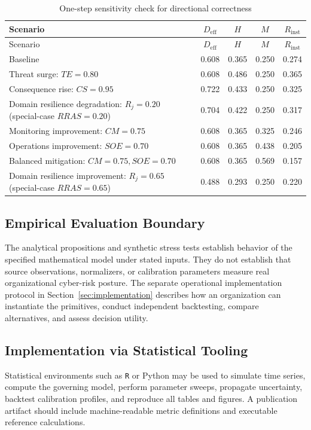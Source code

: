 \documentclass[11pt]{article}
\begin{document}
\begingroup
\small
\setlength{\tabcolsep}{5pt}
\renewcommand{\arraystretch}{1.15}
\begin{longtable}{P{0.47\textwidth} c c c c}
  \caption{One-step sensitivity check for directional correctness}
  \label{tab:sensitivity-check}\\
  \toprule
  Scenario & $D_{\mathrm{eff}}$ & $H$ & $M$ & $R_{\mathrm{inst}}$ \\
  \midrule
  \endfirsthead
  \toprule
  Scenario & $D_{\mathrm{eff}}$ & $H$ & $M$ & $R_{\mathrm{inst}}$ \\
  \midrule
  \endhead
  Baseline & 0.608 & 0.365 & 0.250 & 0.274 \\
  Threat surge: $TE=0.80$ & 0.608 & 0.486 & 0.250 & 0.365 \\
  Consequence rise: $CS=0.95$ & 0.722 & 0.433 & 0.250 & 0.325 \\
  Domain resilience degradation: $R_j=0.20$ (special-case $RRAS=0.20$) & 0.704 & 0.422 & 0.250 & 0.317 \\
  Monitoring improvement: $CM=0.75$ & 0.608 & 0.365 & 0.325 & 0.246 \\
  Operations improvement: $SOE=0.70$ & 0.608 & 0.365 & 0.438 & 0.205 \\
  Balanced mitigation: $CM=0.75,SOE=0.70$ & 0.608 & 0.365 & 0.569 & 0.157 \\
  Domain resilience improvement: $R_j=0.65$ (special-case $RRAS=0.65$) & 0.488 & 0.293 & 0.250 & 0.220 \\
  \bottomrule
\end{longtable}
\endgroup

\subsection{Empirical Evaluation Boundary}
The analytical propositions and synthetic stress tests establish
behavior of the specified mathematical model under stated inputs.
They do not establish that source observations, normalizers, or
calibration parameters measure real organizational cyber-risk
posture. The separate operational implementation protocol in
Section~\ref{sec:implementation} describes how an organization can
instantiate the primitives, conduct independent backtesting,
compare alternatives, and assess decision utility.

\subsection{Implementation via Statistical Tooling}
Statistical environments such as \texttt{R} or Python may be used to simulate time
series, compute the governing model, perform parameter sweeps, propagate uncertainty,
backtest calibration profiles, and reproduce all tables and figures. A publication
artifact should include machine-readable metric definitions and executable reference
calculations.
\end{document}
